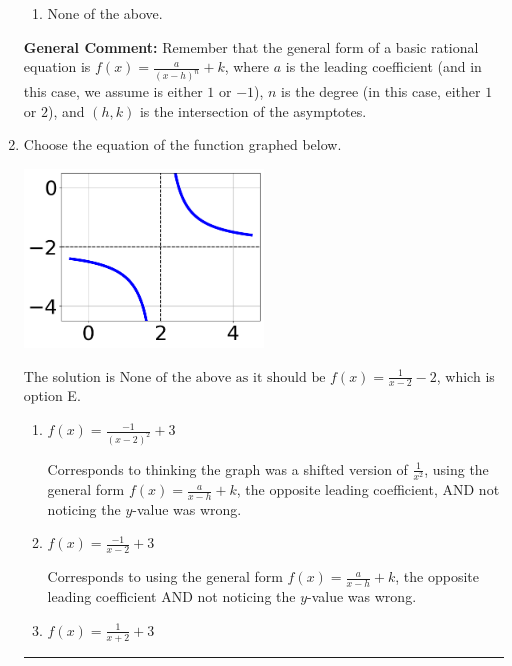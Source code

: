 \documentclass{extbook}[14pt]
\newcommand{\litem}[1]{\item #1

\rule{\textwidth}{0.4pt}}
\begin{document}
\begin{enumerate}
{\begin{enumerate}[label=\Alph*.]
\item None of the above.\end{enumerate}
\textbf{General Comment:} Remember that the general form of a basic rational equation is $ f(x) = \frac{a}{(x-h)^n} + k$, where $a$ is the leading coefficient (and in this case, we assume is either $1$ or $-1$), $n$ is the degree (in this case, either $1$ or $2$), and $(h, k)$ is the intersection of the asymptotes.
}
\litem{
Choose the equation of the function graphed below.

\begin{center}
    \includegraphics[width=0.5\textwidth]{../Figures/rationalGraphToEquationCopyC.png}
\end{center}


The solution is \( \text{None of the above as it should be } f(x) = \frac{1}{x - 2} - 2 \), which is option E.\begin{enumerate}[label=\Alph*.]
\item \( f(x) = \frac{-1}{(x - 2)^2} + 3 \)

Corresponds to thinking the graph was a shifted version of $\frac{1}{x^2}$, using the general form $f(x) = \frac{a}{x-h}+k$, the opposite leading coefficient, AND not noticing the $y$-value was wrong.
\item \( f(x) = \frac{-1}{x - 2} + 3 \)

Corresponds to using the general form $f(x) = \frac{a}{x-h}+k$, the opposite leading coefficient AND not noticing the $y$-value was wrong.
\item \( f(x) = \frac{1}{x + 2} + 3 \)


\end{enumerate}}
\end{enumerate}
\end{document}
